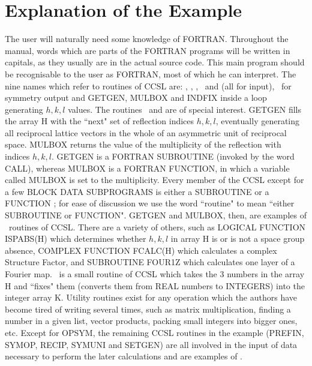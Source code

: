 \section{Explanation of the Example}
The user will naturally need some knowledge of FORTRAN.  Throughout the manual,
words which are parts of the FORTRAN programs will be written in
capitals, as they usually are in the actual source code.  
\pn 
This main program should be recognisable to the user as FORTRAN, most of
which he can interpret.  The nine names which refer to routines of CCSL
are:
\pn 
   , , , \ and 
    (all for input), \
for symmetry output and
   GETGEN, MULBOX and INDFIX inside a loop generating $h,k,l$ values.
\pn 
The routines  \ and  are of special interest.  
GETGEN fills the
array H with the ``next" set of reflection indices $h,k,l$, eventually
generating all reciprocal lattice vectors in
the whole of an asymmetric unit of reciprocal space.  MULBOX returns the
value of the multiplicity of the reflection with indices $h,k,l$.
\pn
GETGEN is a FORTRAN SUBROUTINE (invoked by the word CALL), whereas MULBOX
is a FORTRAN FUNCTION, in which a variable called MULBOX is set to the
multiplicity.
Every member of the CCSL except for a few BLOCK DATA SUBPROGRAMS 
is either a SUBROUTINE or a FUNCTION ;
for ease of discussion we use the word ``routine" to mean ``either
SUBROUTINE or FUNCTION".
\pn 
GETGEN and MULBOX, then, are examples of \ routines of
CCSL.  There are a variety of others, such as LOGICAL FUNCTION ISPABS(H)
which determines whether $h,k,l$\/ in array H is or is not a space group absence,
COMPLEX FUNCTION FCALC(H) which calculates a complex Structure Factor,
and SUBROUTINE FOUR1Z which calculates one layer of a Fourier map.
\pn 
{}\ is a small  routine of CCSL which takes the 3 numbers in
the array H and ``fixes" them (converts them from REAL numbers to INTEGERS)
into the integer array K.  Utility routines exist for any operation which
the authors have become tired of writing several times, such as matrix
multiplication, finding a number in a given list, vector products, packing
small integers into bigger ones, etc.
\pn 
Except for OPSYM, the remaining CCSL routines in the example
(PREFIN, SYMOP, RECIP,
SYMUNI and SETGEN) are all involved in the input of data necessary to
perform the later calculations and are examples of .
